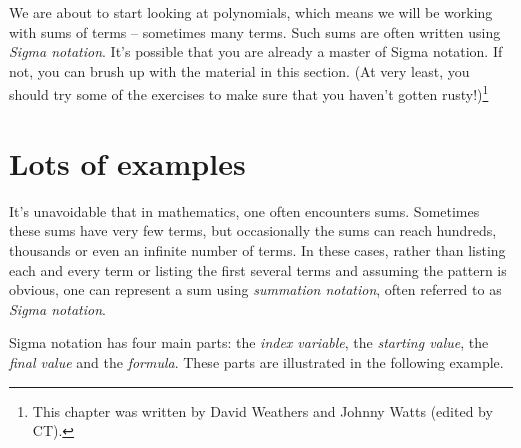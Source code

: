 


We are about to start looking at polynomials, which means we will be working with sums of terms -- sometimes many terms. Such sums are often written using \emph{Sigma notation}.  It's possible that you are already a master of Sigma notation. If not, you can brush up with the material in this section. (At very least, you should try some of the exercises to make sure that you haven't gotten rusty!)\footnote{This chapter was written by David Weathers and Johnny Watts (edited by CT).}

\section{Lots of examples}

It's unavoidable that in mathematics, one often encounters sums.  Sometimes these sums have very few terms, but occasionally the sums can reach hundreds, thousands or even an infinite number of terms.  In these cases, rather than listing each and every term or listing the first several terms and assuming the pattern is obvious, one can represent a sum using \emph{summation notation}, often referred to as \emph{Sigma notation}. 

 Sigma notation has four main parts:  the \emph{index variable}, the \emph{starting value}, the \emph{final value} and the \emph{formula}.
These parts are illustrated in the following example.

